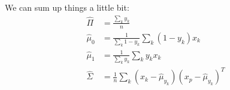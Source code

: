 \documentclass{article}
\begin{document}
We can sum up things a little bit:
\begin{equation*}
    \boxed{\begin{aligned}
            \widehat\Pi    & = \frac{\sum_k y_k}{n}                                                     \\
            \widehat\mu_0  & = \frac{1}{\sum_k 1 - y_k} \sum_k (1-y_k) x_k                              \\
            \widehat\mu_1  & = \frac{1}{\sum_k y_k} \sum_k y_k x_k                                      \\
            \widehat\Sigma & = \frac{1}{n} \sum_k (x_k - \widehat\mu_{y_k}) (x_p - \widehat\mu_{y_k})^T \\
        \end{aligned}}
\end{equation*}
\end{document}
